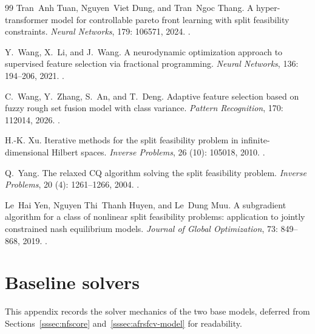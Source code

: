 \documentclass[]{interact}
\theoremstyle{plain}
\theoremstyle{definition}
\theoremstyle{remark}
\begin{document}
\begin{thebibliography}{99}
Tran~Anh Tuan, Nguyen~Viet Dung, and Tran~Ngoc Thang.
\newblock A hyper-transformer model for controllable pareto front learning with split feasibility constraints.
\newblock \emph{Neural Networks}, 179: 106571, 2024.
\newblock {}.

Y.~Wang, X.~Li, and J.~Wang.
\newblock A neurodynamic optimization approach to supervised feature selection via fractional programming.
\newblock \emph{Neural Networks}, 136: 194--206, 2021.
\newblock {}.

C.~Wang, Y.~Zhang, S.~An, and T.~Deng.
\newblock Adaptive feature selection based on fuzzy rough set fusion model with class variance.
\newblock \emph{Pattern Recognition}, 170: 112014, 2026.
\newblock {}.

H.-K. Xu.
\newblock Iterative methods for the split feasibility problem in infinite-dimensional {H}ilbert spaces.
\newblock \emph{Inverse Problems}, 26 (10): 105018, 2010.
\newblock {}.

Q.~Yang.
\newblock The relaxed {CQ} algorithm solving the split feasibility problem.
\newblock \emph{Inverse Problems}, 20 (4): 1261--1266, 2004.
\newblock {}.

Le~Hai Yen, Nguyen Thi~Thanh Huyen, and Le~Dung Muu.
\newblock A subgradient algorithm for a class of nonlinear split feasibility problems: application to jointly constrained nash equilibrium models.
\newblock \emph{Journal of Global Optimization}, 73: 849--868, 2019.
\newblock {}.

\end{thebibliography}


\appendix

\section{Baseline solvers}\label{app:baselines}
This appendix records the solver mechanics of the two base models, deferred from Sections~\ref{sssec:nfscore} and~\ref{sssec:afrsfcv-model} for readability.
\end{document}
